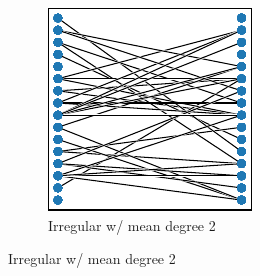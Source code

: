\begin{figure}
\begin{center}
\begin{minipage}{0.95\textwidth}
\begin{minipage}{0.95\linewidth}
\begin{subfigure}[b]{0.5\textwidth}
\includegraphics[width=\textwidth]{img/graph_layouts/title=irregular-2+ext=}%
\caption{
Irregular w/ mean degree 2
}
\label{fig:irregular_2}
\label{fig:irregular_degree_2}
\end{subfigure}

\end{minipage}

\vspace{2ex}

\begin{minipage}{\textwidth}


\end{minipage}
\end{minipage}
\end{center}
\end{figure}
